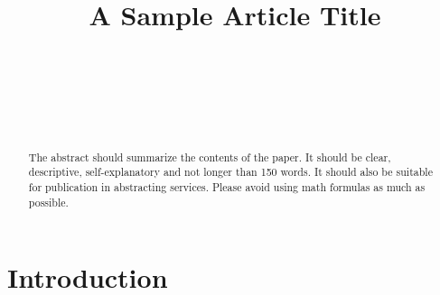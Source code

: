 \documentclass[ecta,nameyear,final]{econsocart}
\theoremstyle{plain}
\theoremstyle{remark}
\begin{document}
\begin{frontmatter}

\title{A Sample Article Title}

\begin{aug}
%
%
%
\author[id=au1,addressref={add1,add11}]{~}
\author[id=au2,addressref={add2}]{~}
\author[id=au3,addressref={add2}]{~}
\address[id=add1]{%
,
}

\address[id=add11]{%
,
}

\address[id=add2]{%
,
}
\end{aug}

%
\begin{abstract}
The abstract should summarize the contents of the paper. It should be clear,
descriptive, self-explanatory and not longer than 150 words. It should also be
suitable for publication in abstracting services. Please avoid using math formulas
as much as possible.
\end{abstract}

\begin{keyword}
\end{keyword}

\end{frontmatter}

\section{Introduction}
\end{document}
